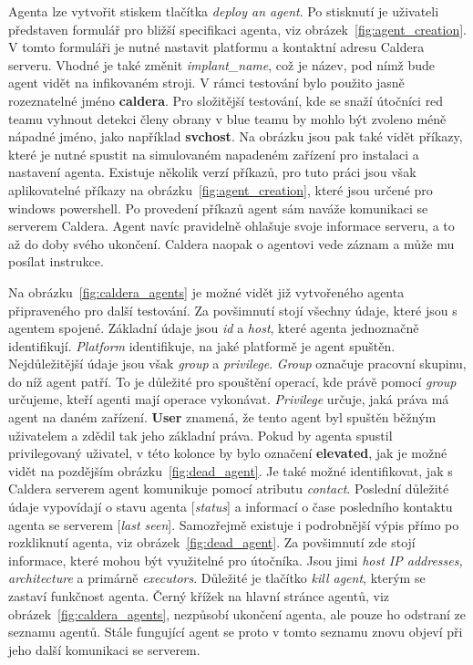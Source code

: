 
Agenta lze vytvořit stiskem tlačítka \textit{deploy an agent}.
Po stisknutí je uživateli představen formulář pro bližší specifikaci agenta, viz obrázek~\ref{fig:agent_creation}.
V tomto formuláři je nutné nastavit platformu a kontaktní adresu Caldera serveru.
Vhodné je také změnit \textit{implant\_name}, což je název, pod nímž bude agent vidět na infikovaném stroji.
V rámci testování bylo použito jasně rozeznatelné jméno \textbf{caldera}.
Pro složitější testování, kde se snaží útočníci red teamu vyhnout detekci členy obrany v blue teamu by mohlo být zvoleno méně nápadné jméno, jako například \textbf{svchost}.
Na obrázku jsou pak také vidět příkazy, které je nutné spustit na simulovaném napadeném zařízení pro instalaci a nastavení agenta.
Existuje několik verzí příkazů, pro tuto práci jsou však aplikovatelné příkazy na obrázku~\ref{fig:agent_creation}, které jsou určené pro windows powershell.
Po provedení příkazů agent sám naváže komunikaci se serverem Caldera.
Agent navíc pravidelně ohlašuje svoje informace serveru, a to až do doby svého ukončení.
Caldera naopak o agentovi vede záznam a může mu posílat instrukce.


Na obrázku~\ref{fig:caldera_agents} je možné vidět již vytvořeného agenta připraveného pro další testování.
Za povšimnutí stojí všechny údaje, které jsou s agentem spojené.
Základní údaje jsou \textit{id} a \textit{host}, které agenta jednoznačně identifikují.
\textit{Platform} identifikuje, na jaké platformě je agent spuštěn.
Nejdůležitější údaje jsou však \textit{group} a \textit{privilege}.
\textit{Group} označuje pracovní skupinu, do níž agent patří.
To je důležité pro spouštění operací, kde právě pomocí \textit{group} určujeme, kteří agenti mají operace vykonávat.
\textit{Privilege} určuje, jaká práva má agent na daném zařízení.
\textbf{User} znamená, že tento agent byl spuštěn běžným uživatelem a zdědil tak jeho základní práva.
Pokud by agenta spustil privilegovaný uživatel, v této kolonce by bylo označení \textbf{elevated}, jak je možné vidět na pozdějším obrázku~\ref{fig:dead_agent}.
Je také možné identifikovat, jak s Caldera serverem agent komunikuje pomocí atributu \textit{contact}.
Poslední důležité údaje vypovídají o stavu agenta [\textit{status}] a informací o čase posledního kontaktu agenta se serverem [\textit{last seen}].
Samozřejmě existuje i podrobnější výpis přímo po rozkliknutí agenta, viz obrázek~\ref{fig:dead_agent}.
Za povšimnutí zde stojí informace, které mohou být využitelné pro útočníka.
Jsou jimi \textit{host IP addresses, architecture} a primárně \textit{executors}.
Důležité je tlačítko \textit{kill agent}, kterým se zastaví funkčnost agenta.
Černý křížek na hlavní stránce agentů, viz obrázek~\ref{fig:caldera_agents}, nezpůsobí ukončení agenta, ale pouze ho odstraní ze seznamu agentů.
Stále fungující agent se proto v tomto seznamu znovu objeví při jeho další komunikaci se serverem.

